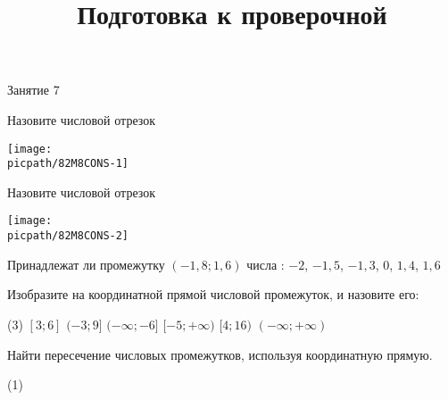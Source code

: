 \begin{class}[number=7]
	\title{Подготовка к проверочной}
	\begin{listofex}
		\item Занятие 7
	\end{listofex}
\end{class}

\begin{exam}
	\begin{listofex}
		\item 
	\end{listofex}
\end{exam}

\begin{consultation}[number=1]
	\begin{listofex}
		\item 
		\begin{minipage}[t]{\bodywidth}
			Назовите числовой отрезок
		\end{minipage}
		\hspace{0.02\linewidth}
		\begin{minipage}[t]{\picwidth}
			\texttt{[image: \\picpath/82M8CONS-1]}
		\end{minipage}
		\item 
		\begin{minipage}[t]{\bodywidth}
			Назовите числовой отрезок
		\end{minipage}
		\hspace{0.02\linewidth}
		\begin{minipage}[t]{\picwidth}
			\texttt{[image: \\picpath/82M8CONS-2]}
		\end{minipage}
		\item Принадлежат ли промежутку \( (-1,8;1,6) \) числа : \( -2 \), \( -1,5 \), \( -1,3 \), \( 0 \), \( 1,4 \), \( 1,6 \)
		\item Изобразите на координатной прямой числовой промежуток, и назовите его:
		\begin{tasks}(3)
			\task \( [3;6] \)
			\task \( (-3;9] \)
			\task \( (-\infty;-6] \)
			\task \( [-5;+\infty) \)
			\task \( [4;16) \)
			\task \( (-\infty;+\infty )\)
		\end{tasks}
		\item Найти пересечение числовых промежутков, используя координатную прямую.
		\begin{tasks}(1)

\end{tasks}
\end{listofex}
\end{consultation}
